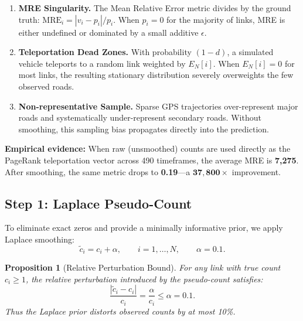 \documentclass[12pt,a4paper]{article}
\theoremstyle{definition}
\theoremstyle{plain}
\newtheorem{proposition}{Proposition}[section]
\begin{document}
\begin{enumerate}[label=\textbf{C\arabic*.}]
  \item \textbf{MRE Singularity.} The Mean Relative Error metric divides by the ground
    truth: $\text{MRE}_i = |v_i - p_i| / p_i$. When $p_i = 0$ for the majority of links,
    MRE is either undefined or dominated by a small additive $\epsilon$.

  \item \textbf{Teleportation Dead Zones.} With probability $(1-d)$, a simulated vehicle
    teleports to a random link weighted by $E_N[i]$. When $E_N[i]=0$ for most links, the
    resulting stationary distribution severely overweights the few observed roads.

  \item \textbf{Non-representative Sample.} Sparse GPS trajectories over-represent major
    roads and systematically under-represent secondary roads. Without smoothing, this
    sampling bias propagates directly into the prediction.
\end{enumerate}

\begin{warning}
  \textbf{Empirical evidence:} When raw (unsmoothed) counts are used directly as the
  PageRank teleportation vector across 490 timeframes, the average MRE is
  \textbf{7{,}275}. After smoothing, the same metric drops to \textbf{0.19}---a
  $\boldsymbol{37{,}800\times}$ improvement.
\end{warning}

\subsection{Step 1: Laplace Pseudo-Count}
\label{sec:laplace}

To eliminate exact zeros and provide a minimally informative prior, we apply Laplace
smoothing:
\begin{equation}
  \tilde{c}_i = c_i + \alpha, \qquad i = 1, \ldots, N, \qquad \alpha = 0.1.
  \label{eq:laplace}
\end{equation}

\begin{proposition}[Relative Perturbation Bound]
  For any link with true count $c_i \geq 1$, the relative perturbation
  introduced by the pseudo-count satisfies:
  \[
    \frac{|\tilde{c}_i - c_i|}{c_i} = \frac{\alpha}{c_i} \leq \alpha = 0.1.
  \]
  Thus the Laplace prior distorts observed counts by at most 10\%.
\end{proposition}
\end{document}
